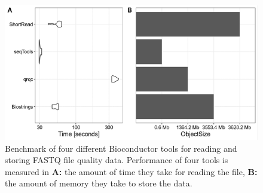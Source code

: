 \documentclass[12pt,twoside]{reedthesis}
\begin{document}
\begin{figure}[h]

{\centering \includegraphics{thesis_files/figure-latex/3f3-1} 

}

\caption{Benchmark of four different Bioconductor tools for reading and storing FASTQ file quality data. Performance of four tools is measured in \textbf{A:} the amount of time they take for reading the file, \textbf{B:} the amount of memory they take to store the data.}\label{fig:3f3}
\end{figure}
\end{document}
